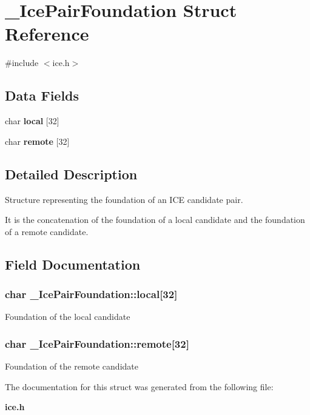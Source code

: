 \section{\_\-IcePairFoundation Struct Reference}
\label{struct__IcePairFoundation}


{\ttfamily \#include $<$ice.h$>$}\subsection*{Data Fields}
\begin{DoxyCompactItemize}
\item 
char {\bf local} [32]
\item 
char {\bf remote} [32]
\end{DoxyCompactItemize}


\subsection{Detailed Description}
Structure representing the foundation of an ICE candidate pair.

It is the concatenation of the foundation of a local candidate and the foundation of a remote candidate. 

\subsection{Field Documentation}
\subsubsection[{local}]{\setlength{\rightskip}{0pt plus 5cm}char {\bf \_\-IcePairFoundation::local}[32]}\label{struct__IcePairFoundation_aceda721078b766a33d0655ebfbc7da06}
Foundation of the local candidate 
\subsubsection[{remote}]{\setlength{\rightskip}{0pt plus 5cm}char {\bf \_\-IcePairFoundation::remote}[32]}\label{struct__IcePairFoundation_a14468b6607f99f9543ad18275e0e56b7}
Foundation of the remote candidate 

The documentation for this struct was generated from the following file:\begin{DoxyCompactItemize}
\item 
{\bf ice.h}\end{DoxyCompactItemize}
